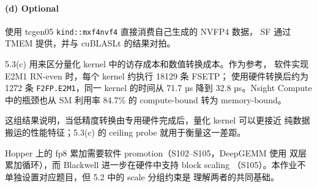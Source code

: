 \documentclass[11pt,a4paper,fontset=fandol]{ctexart}
\begin{document}
\paragraph{(d) Optional}\label{d-optional}

使用 tcgen05 \texttt{kind::mxf4nvf4} 直接消费自己生成的 NVFP4 数据， SF
通过 TMEM 提供，并与 cuBLASLt 的结果对拍。

\begin{lookback}

5.3(c) 用来区分量化 kernel 中的访存成本和数值转换成本。作为参考，
软件实现 E2M1 RN-even 时，每个 kernel 约执行 18129 条 FSETP；
使用硬件转换后约为 1272 条 \texttt{F2FP.E2M1}，同一 kernel 的时间从 71.7
µs 降到 32.8 µs。Nsight Compute 中的瓶颈也从 SM 利用率 84.7\% 的
compute-bound 转为 memory-bound。

这组结果说明，当低精度转换由专用硬件完成后，量化 kernel 可以更接近
纯数据搬运的性能特征；5.3(c) 的 ceiling probe 就用于衡量这一差距。

Hopper 上的 fp8 累加需要软件 promotion（S102--S105，DeepGEMM 使用
双层累加循环），而 Blackwell 进一步在硬件中支持 block scaling
（S105）。本作业不单独设置对应题目，但 5.2 中的 scale 分组约束是
理解两者的共同基础。

\end{lookback}
\end{document}
